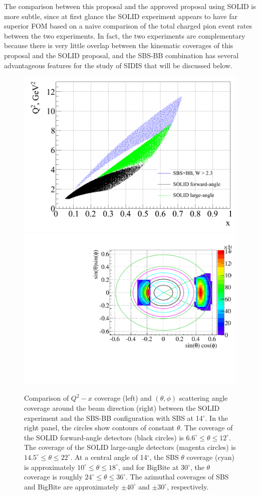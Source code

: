 The comparison between this proposal and the approved proposal using SOLID is more subtle, since at first glance the SOLID experiment appears to have far superior FOM based on a naive comparison of the total charged pion event rates between the two experiments. In fact, the two experiments are complementary because there is very little overlap between the kinematic coverages of this proposal and the SOLID proposal, and the SBS-BB combination has several advantageous features for the study of SIDIS that will be discussed below. 
\begin{figure}[h]
  \begin{center}
    \includegraphics[width=.48\textwidth]{figures/SBS_SOLID_phasecomp_W23.png}
    \includegraphics[width=.48\textwidth]{figures/SBS_SOLID_thetaphicomp.pdf}
  \end{center}
  \caption{\label{SBS_SOLID_phasespace_Comparison} Comparison of $Q^2-x$ coverage (left) and $(\theta,\phi)$ scattering angle coverage around the beam direction (right) between the SOLID experiment and the SBS-BB configuration with SBS at 14$^\circ$. In the right panel, the circles show contours of constant $\theta$. The coverage of the SOLID forward-angle detectors (black circles) is $6.6^\circ \le \theta \le 12^\circ$. The coverage of the SOLID large-angle detectors (magenta circles) is $14.5^\circ \le \theta \le 22^\circ$. At a central angle of 14$^\circ$, the SBS $\theta$ coverage (cyan) is approximately $10^\circ \le \theta \le 18^\circ$, and for BigBite at 30$^\circ$, the $\theta$ coverage is roughly $24^\circ \le \theta \le 36^\circ$. The azimuthal coverages of SBS and BigBite are approximately $\pm 40^\circ$ and $\pm 30^\circ$, respectively.}
\end{figure}
